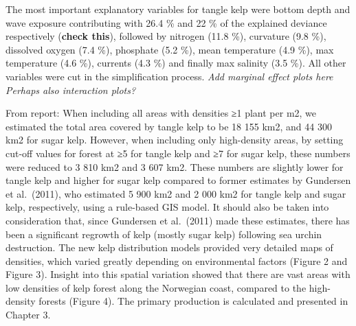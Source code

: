 \documentclass[
]{article}
\begin{document}
The most important explanatory variables for tangle kelp were bottom
depth and wave exposure contributing with 26.4 \% and 22 \% of the
explained deviance respectively (\textbf{check this}), followed by
nitrogen (11.8 \%), curvature (9.8 \%), dissolved oxygen (7.4 \%),
phosphate (5.2 \%), mean temperature (4.9 \%), max temperature (4.6 \%),
currents (4.3 \%) and finally max salinity (3.5 \%). All other variables
were cut in the simplification process. \emph{Add marginal effect plots
here} \emph{Perhaps also interaction plots?}

From report: When including all areas with densities ≥1 plant per m2, we
estimated the total area covered by tangle kelp to be 18 155 km2, and 44
300 km2 for sugar kelp. However, when including only high-density areas,
by setting cut-off values for forest at ≥5 for tangle kelp and ≥7 for
sugar kelp, these numbers were reduced to 3 810 km2 and 3 607 km2. These
numbers are slightly lower for tangle kelp and higher for sugar kelp
compared to former estimates by Gundersen et al.~(2011), who estimated 5
900 km2 and 2 000 km2 for tangle kelp and sugar kelp, respectively,
using a rule-based GIS model. It should also be taken into consideration
that, since Gundersen et al.~(2011) made these estimates, there has been
a significant regrowth of kelp (mostly sugar kelp) following sea urchin
destruction. The new kelp distribution models provided very detailed
maps of densities, which varied greatly depending on environmental
factors (Figure 2 and Figure 3). Insight into this spatial variation
showed that there are vast areas with low densities of kelp forest along
the Norwegian coast, compared to the high-density forests (Figure 4).
The primary production is calculated and presented in Chapter 3.
\end{document}
